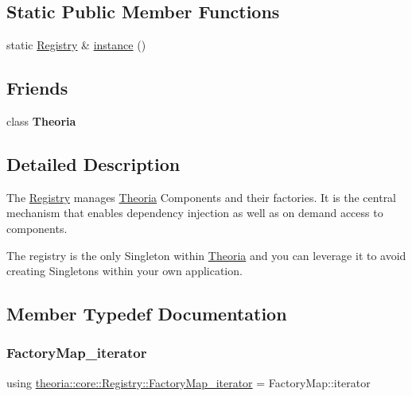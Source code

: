 \subsection*{Static Public Member Functions}
\begin{DoxyCompactItemize}
\item 
static \hyperlink{classtheoria_1_1core_1_1Registry}{Registry} \& \hyperlink{classtheoria_1_1core_1_1Registry_ac36dbf9ae74e19b9fe30f57910e3d93a}{instance} ()
\end{DoxyCompactItemize}
\subsection*{Friends}
\begin{DoxyCompactItemize}
\item 
\mbox{\label{classtheoria_1_1core_1_1Registry_a03f09b9a4f49119b0c16c42ded7cba64}} 
class {\bfseries Theoria}
\end{DoxyCompactItemize}


\subsection{Detailed Description}
The \hyperlink{classtheoria_1_1core_1_1Registry}{Registry} manages \hyperlink{classtheoria_1_1core_1_1Theoria}{Theoria} Components and their factories. It is the central mechanism that enables dependency injection as well as on demand access to components.

The registry is the only Singleton within \hyperlink{classtheoria_1_1core_1_1Theoria}{Theoria} and you can leverage it to avoid creating Singletons within your own application. 

\subsection{Member Typedef Documentation}
\mbox{\label{classtheoria_1_1core_1_1Registry_ae131721f32d396fad4d2d48b0438dca1}} 
\subsubsection{\texorpdfstring{Factory\+Map\+\_\+iterator}{FactoryMap\_iterator}}
{\footnotesize\ttfamily using \hyperlink{classtheoria_1_1core_1_1Registry_ae131721f32d396fad4d2d48b0438dca1}{theoria\+::core\+::\+Registry\+::\+Factory\+Map\+\_\+iterator} =  Factory\+Map\+::iterator}

